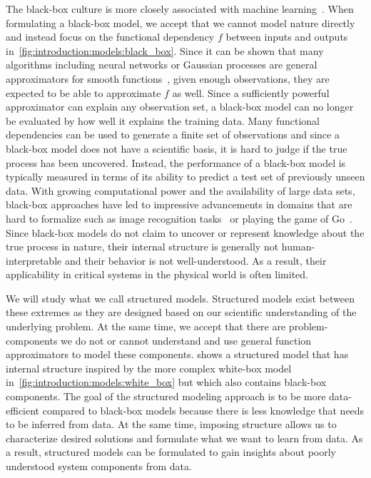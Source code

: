 The black-box culture is more closely associated with machine learning~\parencite{mitchell_machine_1997,goodfellow_deep_2016}.
When formulating a black-box model, we accept that we cannot model nature directly and instead focus on the functional dependency $f$ between inputs and outputs in~\cref{fig:introduction:models:black_box}.
Since it can be shown that many algorithms including neural networks or Gaussian processes are general approximators for smooth functions~\parencite{rasmussen_gaussian_2006}, given enough observations, they are expected to be able to approximate $f$ as well.
Since a sufficiently powerful approximator can explain any observation set, a black-box model can no longer be evaluated by how well it explains the training data.
Many functional dependencies can be used to generate a finite set of observations and since a black-box model does not have a scientific basis, it is hard to judge if the true process has been uncovered.
Instead, the performance of a black-box model is typically measured in terms of its ability to predict a test set of previously unseen data.
With growing computational power and the availability of large data sets, black-box approaches have led to impressive advancements in domains that are hard to formalize such as image recognition tasks~\parencite{lecun_backpropagation_1989} or playing the game of Go~\parencite{silver_mastering_2016}.
Since black-box models do not claim to uncover or represent knowledge about the true process in nature, their internal structure is generally not human-interpretable and their behavior is not well-understood.
As a result, their applicability in critical systems in the physical world is often limited.

We will study what we call structured models.
Structured models exist between these extremes as they are designed based on our scientific understanding of the underlying problem.
At the same time, we accept that there are problem-components we do not or cannot understand and use general function approximators to model these components.
 shows a structured model that has internal structure inspired by the more complex white-box model in~\cref{fig:introduction:models:white_box} but which also contains black-box components.
The goal of the structured modeling approach is to be more data-efficient compared to black-box models because there is less knowledge that needs to be inferred from data.
At the same time, imposing structure allows us to characterize desired solutions and formulate what we want to learn from data.
As a result, structured models can be formulated to gain insights about poorly understood system components from data.


